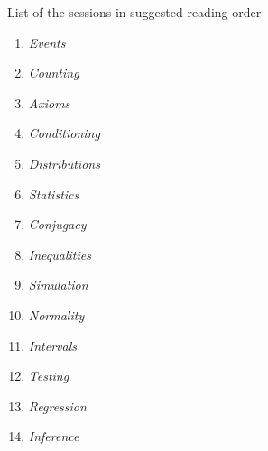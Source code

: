 \documentclass[11pt,a4paper]{article}
\begin{document}
List of the sessions in suggested reading order

\begin{enumerate}
\def\labelenumi{\arabic{enumi}.}
\item \emph{Events}
\item \emph{Counting}
\item \emph{Axioms}
\item \emph{Conditioning}
\item \emph{Distributions}
\item \emph{Statistics}
\item \emph{Conjugacy}
\item \emph{Inequalities}
\item \emph{Simulation}
\item \emph{Normality}
\item \emph{Intervals}
\item \emph{Testing}
\item \emph{Regression}
\item \emph{Inference}
\end{enumerate}
\end{document}
